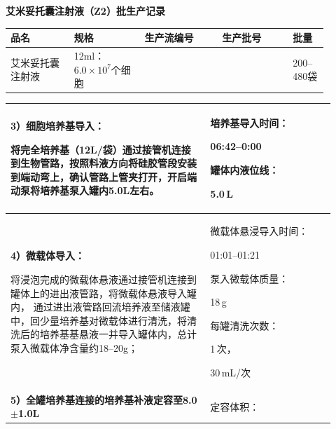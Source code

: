 \documentclass[UTF8,10pt,a4paper,fontset=fandol]{ctexart}
\newcommand{\fieldvalue}[1]{#1}
\newcommand{\handwritten}[1]{#1}
\begin{document}
\newpage

\begin{center}
\textbf{艾米妥托囊注射液（Z2）批生产记录}
\end{center}

\begin{center}
\begin{tabular}{|p{0.18\linewidth}|p{0.20\linewidth}|p{0.22\linewidth}|p{0.20\linewidth}|p{0.10\linewidth}|}
\hline
品名 & 规格 & 生产流编号 & 生产批号 & 批量 \\
\hline
艾米妥托囊注射液 & 12ml：$6.0\times10^7$个细胞 & & & 200--480袋 \\
\hline
\end{tabular}
\end{center}

\begin{tabular}{|p{0.57\linewidth}|p{0.35\linewidth}|}
\hline
\textbf{3）细胞培养基导入：}

将完全培养基（12L/袋）通过接管机连接到生物管路，按照料液方向将硅胶管段安装到端动弯上，确认管路上管夹打开，开启端动泵将培养基泵入罐内5.0L左右。
&
培养基导入时间：

\fieldvalue{\handwritten{06:42--0:00}}

罐体内液位线：

\fieldvalue{\handwritten{5.0}}\,L
\\
\hline
\textbf{4）微载体导入：}

将浸泡完成的微载体悬液通过接管机连接到罐体上的进出液管路，将微载体悬液导入罐内， 通过进出液管路回流培养液至储液罐中，回少量培养基对微载体进行清洗，将清洗后的培养基基悬液一并导入罐体内，总计泵入微载体净含量约18--20g；
&
微载体悬浸导入时间：

\fieldvalue{\handwritten{01:01--01:21}}

泵入微载体质量：

\fieldvalue{\handwritten{18}}\,g

每罐清洗次数：

\fieldvalue{\handwritten{1}}\,次， 

\fieldvalue{\handwritten{30}}\,mL/次
\\
\hline
\textbf{5）全罐培养基连接的培养基补液定容至8.0$\pm$1.0L}
&
定容体积：


\end{tabular}
\end{document}
